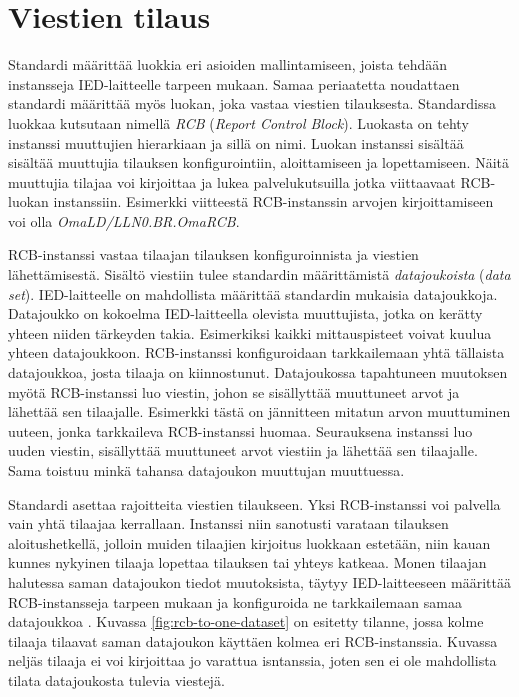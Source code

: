 \section{Viestien tilaus}
Standardi määrittää luokkia eri asioiden mallintamiseen, joista tehdään instansseja IED-laitteelle tarpeen mukaan. Samaa periaatetta noudattaen standardi määrittää myös luokan, joka vastaa viestien tilauksesta. Standardissa luokkaa kutsutaan nimellä \emph{RCB} (\emph{Report Control Block}). Luokasta on tehty instanssi muuttujien hierarkiaan ja sillä on nimi. Luokan instanssi sisältää sisältää muuttujia tilauksen konfigurointiin, aloittamiseen ja lopettamiseen. Näitä muuttujia tilajaa voi kirjoittaa ja lukea palvelukutsuilla jotka viittaavaat RCB-luokan instanssiin. Esimerkki viitteestä RCB-instanssin arvojen kirjoittamiseen voi olla \emph{OmaLD/LLN0.BR.OmaRCB}. \mbox{\cite[s.~95--97]{IEC61850-7-2}}

RCB-instanssi vastaa tilaajan tilauksen konfiguroinnista ja viestien lähettämisestä. Sisältö viestiin tulee standardin määrittämistä \emph{datajoukoista} (\emph{data set}). IED-laitteelle on mahdollista määrittää standardin mukaisia datajoukkoja. Datajoukko on kokoelma IED-laitteella olevista muuttujista, jotka on kerätty yhteen niiden tärkeyden takia. Esimerkiksi kaikki mittauspisteet voivat kuulua yhteen datajoukkoon. RCB-instanssi konfiguroidaan tarkkailemaan yhtä tällaista datajoukkoa, josta tilaaja on kiinnostunut. Datajoukossa tapahtuneen muutoksen myötä RCB-instanssi luo viestin, johon se sisällyttää muuttuneet arvot ja lähettää sen tilaajalle. Esimerkki tästä on jännitteen mitatun arvon muuttuminen uuteen, jonka tarkkaileva RCB-instanssi huomaa. Seurauksena instanssi luo uuden viestin, sisällyttää muuttuneet arvot viestiin ja lähettää sen tilaajalle. Sama toistuu minkä tahansa datajoukon muuttujan muuttuessa. \mbox{\cite[s.~93]{IEC61850-7-2}}

Standardi asettaa rajoitteita viestien tilaukseen. Yksi RCB-instanssi voi palvella vain yhtä tilaajaa kerrallaan. Instanssi niin sanotusti varataan tilauksen aloitushetkellä, jolloin muiden tilaajien kirjoitus luokkaan estetään, niin kauan kunnes nykyinen tilaaja lopettaa tilauksen tai yhteys katkeaa. Monen tilaajan halutessa saman datajoukon tiedot muutoksista, täytyy IED-laitteeseen määrittää RCB-instansseja tarpeen mukaan ja konfiguroida ne tarkkailemaan samaa datajoukkoa \cite[s.~93]{IEC61850-7-2}. Kuvassa \ref{fig:rcb-to-one-dataset} on esitetty tilanne, jossa kolme tilaaja tilaavat saman datajoukon käyttäen kolmea eri RCB-instanssia. Kuvassa neljäs tilaaja ei voi kirjoittaa jo varattua isntanssia, joten sen ei ole mahdollista tilata datajoukosta tulevia viestejä.

